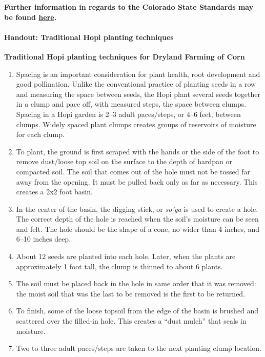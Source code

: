 \documentclass[12pt,]{article}
\providecommand{\tightlist}{%
  \setlength{\itemsep}{0pt}\setlength{\parskip}{0pt}}
\let\oldparagraph\paragraph
\renewcommand{\paragraph}[1]{\oldparagraph{#1}\mbox{}}
\begin{document}
\textbf{Further information in regards to the Colorado State Standards may be found \href{http://www2.cde.state.co.us/scripts/allstandards/COStandards.asp}{here}.}

\hypertarget{handout-traditional-hopi-planting-techniques}{%
\paragraph{Handout: Traditional Hopi planting techniques}\label{handout-traditional-hopi-planting-techniques}}

\textbf{Traditional Hopi planting techniques for Dryland Farming of Corn}

\begin{enumerate}
\def\labelenumi{\arabic{enumi}.}
\tightlist
\item
  Spacing is an important consideration for plant health, root development and good pollination. Unlike the conventional practice of planting seeds in a row and measuring the space between seeds, the Hopi plant several seeds together in a clump and pace off, with measured steps, the space between clumps. Spacing in a Hopi garden is 2--3 adult paces/steps, or 4--6 feet, between clumps. Widely spaced plant clumps creates groups of reservoirs of moisture for each clump.
\item
  To plant, the ground is first scraped with the hands or the side of the foot to remove dust/loose top soil on the surface to the depth of hardpan or compacted soil. The soil that comes out of the hole must not be tossed far away from the opening. It must be pulled back only as far as necessary. This creates a 2x2 foot basin.
\item
  In the center of the basin, the digging stick, or \emph{so'ya} is used to create a hole. The correct depth of the hole is reached when the soil's moisture can be seen and felt. The hole should be the shape of a cone, no wider than 4 inches, and 6--10 inches deep.
\item
  About 12 seeds are planted into each hole. Later, when the plants are approximately 1 foot tall, the clump is thinned to about 6 plants.
\item
  The soil must be placed back in the hole in same order that it was removed: the moist soil that was the last to be removed is the first to be returned.
\item
  To finish, some of the loose topsoil from the edge of the basin is brushed and scattered over the filled-in hole. This creates a ``dust mulch'' that seals in moisture.
\item
  Two to three adult paces/steps are taken to the next planting clump location.
\end{enumerate}
\end{document}
